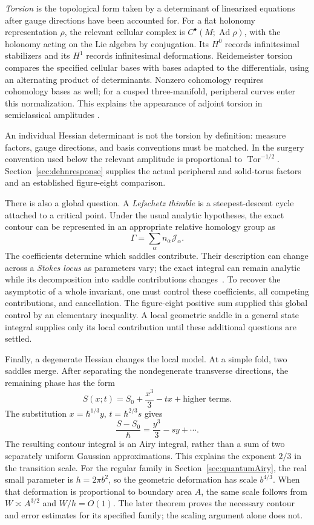 \emph{Torsion} is the topological form taken by a determinant of
linearized equations after gauge directions have been accounted
for. For a flat holonomy representation $\rho$, the relevant
cellular complex is $C^\bullet(M;\operatorname{Ad}\rho)$, with the
holonomy acting on the Lie algebra by conjugation.
Its $H^0$ records infinitesimal stabilizers and its $H^1$ records
infinitesimal deformations. Reidemeister torsion compares the
specified cellular bases with bases adapted to the differentials,
using an alternating product of determinants. Nonzero cohomology
requires cohomology bases as well; for a cusped three-manifold,
peripheral curves enter this normalization. This explains the
appearance of adjoint torsion in semiclassical amplitudes
\cite{WittenJones,DimofteGaroufalidis}.

An individual Hessian determinant is not the torsion by definition:
measure factors, gauge directions, and basis conventions must be
matched. In the surgery convention used below the relevant
amplitude is proportional to $\operatorname{Tor}^{-1/2}$.
Section~\ref{sec:dehnresponse} supplies the actual peripheral and
solid-torus factors and an established figure-eight comparison.

There is also a global question. A \emph{Lefschetz thimble} is a
steepest-descent cycle attached to a critical point. Under the
usual analytic hypotheses, the exact contour can be represented
in an appropriate relative homology group as
\[
 \Gamma=\sum_\alpha n_\alpha\mathcal J_\alpha.
\]
The coefficients determine which saddles contribute. Their
description can change across a \emph{Stokes locus} as parameters
vary; the exact integral can remain analytic while its decomposition
into saddle contributions changes~\cite[Sections 2--3]{WittenContinuation}.
To recover the asymptotic of a whole invariant, one must control
these coefficients, all competing contributions, and cancellation.
The figure-eight positive sum supplied this global control by an
elementary inequality. A local geometric saddle in a general
state integral supplies only its local contribution until these
additional questions are settled.

Finally, a degenerate Hessian changes the local model. At a simple
fold, two saddles merge. After separating the nondegenerate
transverse directions, the remaining phase has the form
\[
 S(x;t)=S_0+\frac{x^3}{3}-tx+\text{higher terms}.
\]
The substitution $x=\hbar^{1/3}y$, $t=\hbar^{2/3}s$ gives
\[
 \frac{S-S_0}{\hbar}=\frac{y^3}{3}-sy+\cdots.
\]
The resulting contour integral is an Airy integral, rather than
a sum of two separately uniform Gaussian approximations. This
explains the exponent $2/3$ in the transition scale. For the regular
family in Section~\ref{sec:quantumAiry}, the real small parameter
is $h=2\pi b^2$, so the geometric deformation has scale
$b^{4/3}$. When that deformation is proportional to boundary area
$A$, the same scale follows from $W\asymp A^{3/2}$ and $W/h=O(1)$.
The later theorem proves the necessary contour and error estimates
for its specified family; the scaling argument alone does not.


